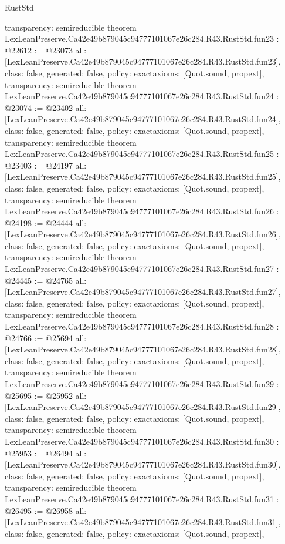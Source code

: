 \begin{lexlean}{RustStd}
\begin{coremodule}
{  transparency: semireducible
}
theorem LexLeanPreserve.Ca42e49b879045c94777101067e26c284.R43.RustStd.fun23 : @22612 := @23073 {
  all: [LexLeanPreserve.Ca42e49b879045c94777101067e26c284.R43.RustStd.fun23],
  class: false,
  generated: false,
  policy: exact{axioms: [Quot.sound, propext]},
  transparency: semireducible
}
theorem LexLeanPreserve.Ca42e49b879045c94777101067e26c284.R43.RustStd.fun24 : @23074 := @23402 {
  all: [LexLeanPreserve.Ca42e49b879045c94777101067e26c284.R43.RustStd.fun24],
  class: false,
  generated: false,
  policy: exact{axioms: [Quot.sound, propext]},
  transparency: semireducible
}
theorem LexLeanPreserve.Ca42e49b879045c94777101067e26c284.R43.RustStd.fun25 : @23403 := @24197 {
  all: [LexLeanPreserve.Ca42e49b879045c94777101067e26c284.R43.RustStd.fun25],
  class: false,
  generated: false,
  policy: exact{axioms: [Quot.sound, propext]},
  transparency: semireducible
}
theorem LexLeanPreserve.Ca42e49b879045c94777101067e26c284.R43.RustStd.fun26 : @24198 := @24444 {
  all: [LexLeanPreserve.Ca42e49b879045c94777101067e26c284.R43.RustStd.fun26],
  class: false,
  generated: false,
  policy: exact{axioms: [Quot.sound, propext]},
  transparency: semireducible
}
theorem LexLeanPreserve.Ca42e49b879045c94777101067e26c284.R43.RustStd.fun27 : @24445 := @24765 {
  all: [LexLeanPreserve.Ca42e49b879045c94777101067e26c284.R43.RustStd.fun27],
  class: false,
  generated: false,
  policy: exact{axioms: [Quot.sound, propext]},
  transparency: semireducible
}
theorem LexLeanPreserve.Ca42e49b879045c94777101067e26c284.R43.RustStd.fun28 : @24766 := @25694 {
  all: [LexLeanPreserve.Ca42e49b879045c94777101067e26c284.R43.RustStd.fun28],
  class: false,
  generated: false,
  policy: exact{axioms: [Quot.sound, propext]},
  transparency: semireducible
}
theorem LexLeanPreserve.Ca42e49b879045c94777101067e26c284.R43.RustStd.fun29 : @25695 := @25952 {
  all: [LexLeanPreserve.Ca42e49b879045c94777101067e26c284.R43.RustStd.fun29],
  class: false,
  generated: false,
  policy: exact{axioms: [Quot.sound, propext]},
  transparency: semireducible
}
theorem LexLeanPreserve.Ca42e49b879045c94777101067e26c284.R43.RustStd.fun30 : @25953 := @26494 {
  all: [LexLeanPreserve.Ca42e49b879045c94777101067e26c284.R43.RustStd.fun30],
  class: false,
  generated: false,
  policy: exact{axioms: [Quot.sound, propext]},
  transparency: semireducible
}
theorem LexLeanPreserve.Ca42e49b879045c94777101067e26c284.R43.RustStd.fun31 : @26495 := @26958 {
  all: [LexLeanPreserve.Ca42e49b879045c94777101067e26c284.R43.RustStd.fun31],
  class: false,
  generated: false,
  policy: exact{axioms: [Quot.sound, propext]},
}
\end{coremodule}
\end{lexlean}
